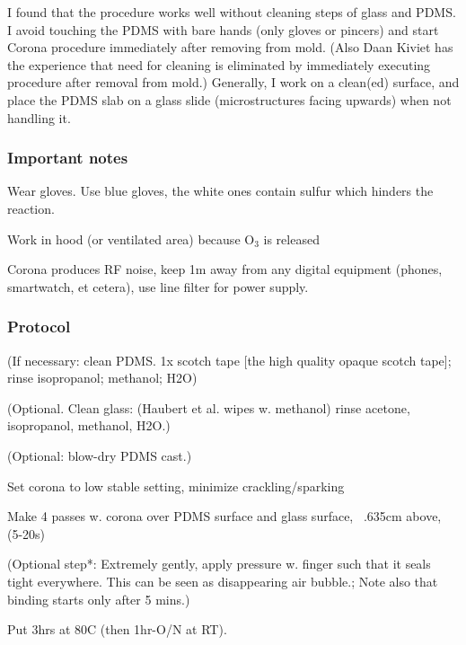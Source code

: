 I found that the procedure works well without cleaning steps of glass and PDMS. I avoid touching the PDMS with bare hands (only gloves or pincers) and start Corona procedure immediately after removing from mold. (Also Daan Kiviet has the experience that need for cleaning is eliminated by immediately executing procedure after removal from mold.) Generally, I work on a clean(ed) surface, and place the PDMS slab on a glass slide (microstructures facing upwards) when not handling it. 

\subsubsection*{Important notes}
\begin{compactitem}
    \item Wear gloves. Use blue gloves, the white ones contain sulfur which hinders the reaction.
    \item Work in hood (or ventilated area) because $\text{O}_\text{3}$ is released
    \item Corona produces RF noise, keep 1m away from any digital equipment (phones, smartwatch, et cetera), use line filter for power supply.     
\end{compactitem}

\subsubsection*{Protocol}
\begin{compactitem}
    \item (If necessary: clean PDMS. 1x scotch tape [the high quality opaque scotch tape]; rinse isopropanol; methanol; H2O)
    \item (Optional. Clean glass: (Haubert et al. wipes w. methanol) rinse acetone, isopropanol, methanol, H2O.)
    \item (Optional: blow-dry PDMS cast.)
    \item Set corona to low stable setting, minimize crackling/sparking
    \item Make 4 passes w. corona over PDMS surface and glass surface, ~.635cm above, (5-20s)
    \item (Optional step*: Extremely gently, apply pressure w. finger such that it seals tight everywhere. This can be seen as disappearing air bubble.; Note also that binding starts only after 5 mins.)
    \item Put 3hrs at 80C (then 1hr-O/N at RT).
\end{compactitem}

